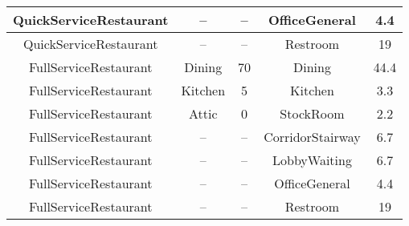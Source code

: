 \begin{table}[t]
\begin{tabular}{|c|c|c|c|c|}
QuickServiceRestaurant & --                      & --                                                                                                            & OfficeGeneral            & 4.4                                                                                                            \\ \hline
QuickServiceRestaurant & --                      & --                                                                                                            & Restroom                 & 19                                                                                                             \\ \hline
FullServiceRestaurant  & Dining                  & 70                                                                                                            & Dining                   & 44.4                                                                                                           \\ \hline
FullServiceRestaurant  & Kitchen                 & 5                                                                                                             & Kitchen                  & 3.3                                                                                                            \\ \hline
FullServiceRestaurant  & Attic                   & 0                                                                                                             & StockRoom                & 2.2                                                                                                            \\ \hline
FullServiceRestaurant  & --                      & --                                                                                                            & CorridorStairway         & 6.7                                                                                                            \\ \hline
FullServiceRestaurant  & --                      & --                                                                                                            & LobbyWaiting             & 6.7                                                                                                            \\ \hline
FullServiceRestaurant  & --                      & --                                                                                                            & OfficeGeneral            & 4.4                                                                                                            \\ \hline
FullServiceRestaurant  & --                      & --                                                                                                            & Restroom                 & 19                                                                                                             \\ \hline
\end{tabular}
\end{table}
